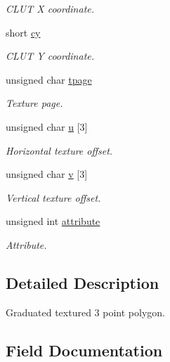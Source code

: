 \begin{DoxyCompactItemize}
\begin{DoxyCompactList}\small\item\em C\+L\+UT X coordinate. \end{DoxyCompactList}\item 
short \hyperlink{structGsGTPoly3_a1504800135de6f86d07517280dedf6cd}{cy}
\begin{DoxyCompactList}\small\item\em C\+L\+UT Y coordinate. \end{DoxyCompactList}\item 
unsigned char \hyperlink{structGsGTPoly3_ae9f3507974206172e48621b837b7f0c7}{tpage}
\begin{DoxyCompactList}\small\item\em Texture page. \end{DoxyCompactList}\item 
unsigned char \hyperlink{structGsGTPoly3_ac72eba19e1f30004e1fc469b59926236}{u} \mbox{[}3\mbox{]}
\begin{DoxyCompactList}\small\item\em Horizontal texture offset. \end{DoxyCompactList}\item 
unsigned char \hyperlink{structGsGTPoly3_a1a9b6fe80157c16a3848ae5ea9aaa0d7}{v} \mbox{[}3\mbox{]}
\begin{DoxyCompactList}\small\item\em Vertical texture offset. \end{DoxyCompactList}\item 
unsigned int \hyperlink{structGsGTPoly3_a974c933683a793903a7004911d45ff01}{attribute}
\begin{DoxyCompactList}\small\item\em Attribute. \end{DoxyCompactList}\end{DoxyCompactItemize}


\subsection{Detailed Description}
Graduated textured 3 point polygon. 

\subsection{Field Documentation}
\mbox{\label{structGsGTPoly3_a974c933683a793903a7004911d45ff01}} 
